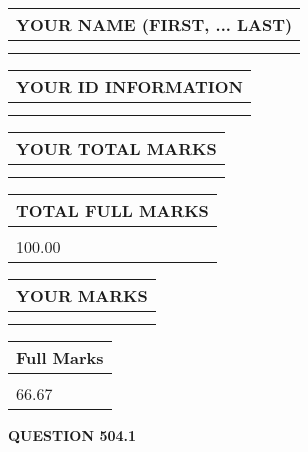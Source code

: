 \documentclass{ctexart}
\begin{document}
   
   
   
\newpage 
\setcounter{page}{ 
   504001 } 
   
   
   
   
\noindent\begin{tabular}{|l|}
\hline
YOUR NAME (FIRST, ... LAST)  \\
\hline
 \\ 
 \\ 
\hline
\end{tabular}
\hspace{0.05in} \begin{tabular}{|l|}
\hline
 YOUR   ID   INFORMATION  \\
\hline
 \\ 
 \\ 
\hline
\end{tabular}
   
   
\vspace{0.2in}\noindent\begin{tabular}{|l|}
\hline
YOUR TOTAL MARKS  \\
\hline
 \\ 
 \\ 
\hline
\end{tabular}
\hspace{0.05in} \begin{tabular}{|l|}
\hline
TOTAL FULL MARKS  \\
\hline
 \\ 
100.00 \\
\hline
\end{tabular}
   
   
 \vspace{0.2in}
 
 
 
 
   
   
  
\vspace{0.2in}
  
\noindent\begin{tabular}{|l|}
\hline
 YOUR MARKS  \\
\hline
 \\ 
 \\ 
\hline
\end{tabular}
\hspace{0.05in} \begin{tabular}{|l|}
\hline
 Full Marks  \\
\hline
 \\ 
66.67 \\
\hline
\end{tabular}
{\textbf{\Large{QUESTION
504.1 
}}}
  
\end{document}
